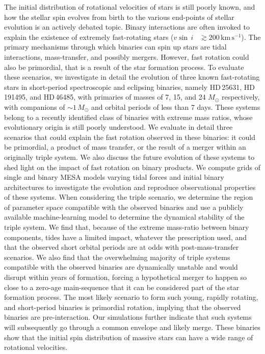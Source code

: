 \documentclass{aa}
\newcommand{\kms}{$\mathrm{km\,s^{-1}}$}
\newcommand{\vsini} {$v\sin\,i$}
\begin{document}
\abstract
{The initial distribution of rotational velocities of stars is still
  poorly known, and how the stellar spin evolves from birth to the
  various end-points of stellar evolution is an actively debated
  topic. Binary interactions are often invoked to explain the
  existence of extremely fast-rotating stars (\vsini~
  $\gtrsim 200$\,\kms). The primary mechanisms through which binaries
  can spin up stars are tidal interactions, mass-transfer, and
  possibly mergers. However, fast rotation could also be primordial,
  that is a result of the star formation process. 
  To evaluate these scenarios, we investigate in detail the
  evolution of three known fast-rotating stars in short-period spectroscopic and eclipsing
  binaries, namely HD\,25631, HD\,191495, and HD\,46485, with
  primaries of masses of 7, 15, and 24 $M_{\odot}$ respectively, with
  companions of $\sim1\,M_\odot$ and orbital periods of less than 7 days. These systems belong to a
  recently identified class of binaries with extreme mass ratios, whose evolutionary origin is still poorly understood.}
{We evaluate in detail three scenarios that could explain the fast
    rotation observed in these binaries: it could be primordial, a
    product of mass transfer, or the result of a merger within an
    originally triple system. We also discuss the future evolution of
    these systems to shed light on the impact of fast rotation on
    binary products.}
  {We compute grids of single and binary MESA models varying tidal
      forces and initial binary architectures to investigate the
      evolution and reproduce observational properties of these
      systems. When considering the triple scenario, we determine the
      region of parameter space compatible with the observed binaries
      and use a publicly available machine-learning model to determine
      the dynamical stability of the triple system.}
{We find that, because of the extreme mass-ratio between binary components,
     tides have a limited impact, whatever the prescription used, and that
    the observed short orbital periods are at odds with post-mass-transfer
    scenarios.
   We also find that the overwhelming majority of triple systems compatible with the observed binaries are dynamically unstable and would disrupt within years of formation, forcing a hypothetical merger to happen so close to a zero-age main-sequence that it can be considered part of the star formation process.}
 {The most likely scenario to form such young, rapidly rotating,
    and short-period binaries is primordial rotation, implying that the
    observed binaries are pre-interaction. Our simulations further indicate
  that such systems will subsequently go through a common envelope and
  likely merge. These binaries show that the initial spin distribution of massive
  stars can have a wide range of rotational velocities.}
{}
\end{document}
